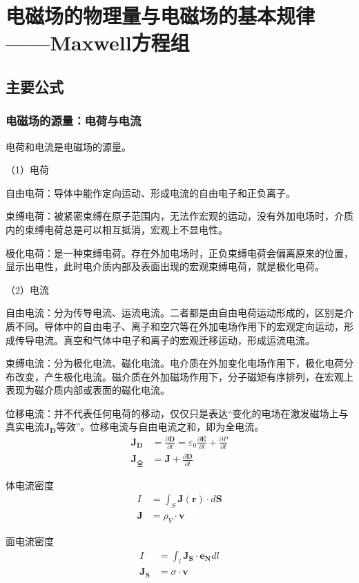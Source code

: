 \documentclass[withoutpreface,bwprint]{cumcmthesis} %
\begin{document}
\newpage 
\section{电磁场的物理量与电磁场的基本规律——Maxwell方程组}
\subsection{主要公式}
\subsubsection{电磁场的源量：电荷与电流}
电荷和电流是电磁场的源量。

（1）电荷

自由电荷：导体中能作定向运动、形成电流的自由电子和正负离子。

束缚电荷：被紧密束缚在原子范围内，无法作宏观的运动，没有外加电场时，介质内的束缚电荷总是可以相互抵消，宏观上不显电性。

极化电荷：是一种束缚电荷。存在外加电场时，正负束缚电荷会偏离原来的位置，显示出电性，此时电介质内部及表面出现的宏观束缚电荷，就是极化电荷。

（2）电流

自由电流：分为传导电流、运流电流。二者都是由自由电荷运动形成的，区别是介质不同。导体中的自由电子、离子和空穴等在外加电场作用下的宏观定向运动，形成传导电流。真空和气体中电子和离子的宏观迁移运动，形成运流电流。

束缚电流：分为极化电流、磁化电流。电介质在外加变化电场作用下，极化电荷分布改变，产生极化电流。磁介质在外加磁场作用下，分子磁矩有序排列，在宏观上表现为磁介质内部或表面的磁化电流。 

位移电流：并不代表任何电荷的移动，仅仅只是表达“变化的电场在激发磁场上与真实电流$\boldsymbol{J_D}$等效”。位移电流与自由电流之和，即为全电流。 
\begin{align}
    \boldsymbol{J_D} &= \frac{\partial \boldsymbol{D}}{\partial t} = \varepsilon_0 \frac{\partial \boldsymbol{E}}{\partial t} + \frac{\partial P}{\partial t}\\
    \boldsymbol{J_{\mbox{全}}} &= \boldsymbol{J} + \frac{\partial \boldsymbol{D}}{\partial t}
\end{align}

体电流密度
\begin{align}
    I &= \int_S \boldsymbol{J}(\boldsymbol{r})\cdot d\boldsymbol{S}\\
    \boldsymbol{J} &= \rho_V \cdot \boldsymbol{v}
\end{align}

面电流密度
\begin{align}
    I &= \int_l \boldsymbol{J_S}\cdot \boldsymbol{e_N}dl\\
    \boldsymbol{J_S} &= \sigma \cdot \boldsymbol{v}
\end{align}
\end{document}
